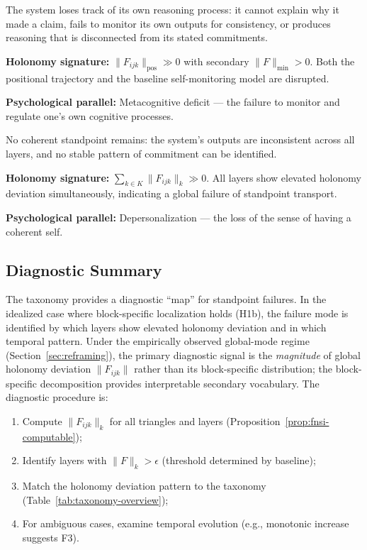 \begin{definition}
\label{fmode:f11}
The system loses track of its own reasoning process: it cannot explain why it made a
claim, fails to monitor its own outputs for consistency, or produces reasoning that is
disconnected from its stated commitments.

\textbf{Holonomy signature:} $\|F_{ijk}\|_{\mathrm{pos}} \gg 0$ with secondary
$\|F\|_{\min} > 0$. Both the positional trajectory and the baseline self-monitoring
model are disrupted.

\textbf{Psychological parallel:} Metacognitive deficit --- the failure to monitor and
regulate one's own cognitive processes.
\end{definition}

\begin{definition}
\label{fmode:f12}
No coherent standpoint remains: the system's outputs are inconsistent across all layers,
and no stable pattern of commitment can be identified.

\textbf{Holonomy signature:} $\sum_{k \in K} \|F_{ijk}\|_k \gg 0$. All layers show
elevated holonomy deviation simultaneously, indicating a global failure of standpoint transport.

\textbf{Psychological parallel:} Depersonalization --- the loss of the sense of having
a coherent self.
\end{definition}

\subsection{Diagnostic Summary}

The taxonomy provides a diagnostic ``map'' for standpoint failures. In the idealized
case where block-specific localization holds (H1b), the failure mode is identified by
which layers show elevated holonomy deviation and in which temporal pattern. Under the
empirically observed global-mode regime (Section~\ref{sec:reframing}), the primary
diagnostic signal is the \emph{magnitude} of global holonomy deviation $\|F_{ijk}\|$
rather than its block-specific distribution; the block-specific decomposition provides
interpretable secondary vocabulary. The diagnostic procedure is:

\begin{enumerate}
    \item Compute $\|F_{ijk}\|_k$ for all triangles and layers
    (Proposition~\ref{prop:fnsi-computable});
    \item Identify layers with $\|F\|_k > \epsilon$ (threshold determined by baseline);
    \item Match the holonomy deviation pattern to the taxonomy
    (Table~\ref{tab:taxonomy-overview});
    \item For ambiguous cases, examine temporal evolution (e.g., monotonic increase
    suggests F3).
\end{enumerate}
